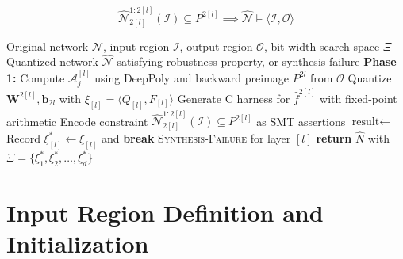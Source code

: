 \begin{equation}\label{eq:main_preposition_milp}
\hat{\mathcal{N}}^{1:2[l]}_{2[l]}(\mathcal{I}) \subseteq P^{2[l]} \implies \hat{\mathcal{N}} \models \langle \mathcal{I}, \mathcal{O} \rangle
\end{equation}

\begin{algorithm}[H]
\caption{SMT-Based Quantization Synthesis for Robust Neural Networks}
\label{alg:quantization_synthesis}
\begin{algorithmic}[1]
\Require Original network $\mathcal N$, input region $\mathcal{I}$, output region $\mathcal{O}$, bit-width search space $\Xi$
\Ensure Quantized network $\mathcal{\hat{N}}$ satisfying robustness property, or synthesis failure
\State \textbf{Phase 1:} Compute $\mathcal{A}^{[l]}_{j}$ using DeepPoly and backward preimage $P^{2l}$ from $\mathcal{O}$
        \State Quantize $\mathbf{W}^{2[l]}, \mathbf{b}_{2l}$ with $\xi_{[l]} = \langle Q_{[l]}, F_{[l]} \rangle$
        \State Generate C harness for $\hat{f}^{2[l]}$ with fixed-point arithmetic
        \State Encode constraint $\mathcal{\hat{N}}^{1:2[l]}_{2[l]}(\mathcal{I}) \subseteq P^{2[l]}$ as SMT assertions
        \State $\text{result} \gets$ 
            \State Record $\xi_{[l]}^* \gets \xi_{[l]}$ and \textbf{break}
        \EndIf
    \EndFor
        \State \Return \textsc{Synthesis-Failure} for layer $[l]$
    \EndIf
\EndFor
\State \textbf{return} $\hat{N}$ with $\Xi = \{\xi_1^*, \xi_2^*, \ldots, \xi_d^*\}$
\end{algorithmic}
\end{algorithm}

\section{Input Region Definition and Initialization}




